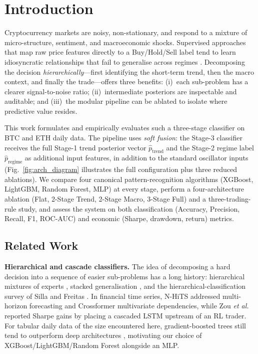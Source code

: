 \documentclass[conference]{IEEEtran}
\begin{document}
\section{Introduction}
Cryptocurrency markets are noisy, non-stationary, and respond to a mixture of micro-structure, sentiment, and macroeconomic shocks. Supervised approaches that map raw price features directly to a Buy/Hold/Sell label tend to learn idiosyncratic relationships that fail to generalise across regimes \cite{sezer2020,patel2015trend}. Decomposing the decision \emph{hierarchically}---first identifying the short-term trend, then the macro context, and finally the trade---offers three benefits: (i)~each sub-problem has a clearer signal-to-noise ratio; (ii)~intermediate posteriors are inspectable and auditable; and (iii)~the modular pipeline can be ablated to isolate where predictive value resides.

This work formulates and empirically evaluates such a three-stage classifier on BTC and ETH daily data. The pipeline uses \emph{soft fusion}: the Stage-3 classifier receives the full Stage-1 trend posterior vector $\hat p_{\mathrm{trend}}$ and the Stage-2 regime label $\hat p_{\mathrm{regime}}$ as additional input features, in addition to the standard oscillator inputs (Fig.~\ref{fig:arch_diagram} illustrates the full configuration plus three reduced ablations). We compare four canonical pattern-recognition algorithms (XGBoost, LightGBM, Random Forest, MLP) at every stage, perform a four-architecture ablation (Flat, 2-Stage Trend, 2-Stage Macro, 3-Stage Full) and a three-trading-rule study, and assess the system on both classification (Accuracy, Precision, Recall, F1, ROC-AUC) and economic (Sharpe, drawdown, return) metrics.

\subsection{Related Work}
\textbf{Hierarchical and cascade classifiers.} The idea of decomposing a hard decision into a sequence of easier sub-problems has a long history: hierarchical mixtures of experts \cite{jordan1994hme}, stacked generalisation \cite{wolpert1992stacked}, and the hierarchical-classification survey of Silla and Freitas \cite{silla2011hierarchical}. In financial time series, N-HiTS \cite{challu2023nhits} addressed multi-horizon forecasting and Crossformer \cite{zhang2023crossformer} multivariate dependencies, while Zou \emph{et al.} \cite{zou2024cascadelstm} reported Sharpe gains by placing a cascaded LSTM upstream of an RL trader. For tabular daily data of the size encountered here, gradient-boosted trees still tend to outperform deep architectures \cite{grinsztajn2022tabular,shwartzziv2022tabular}, motivating our choice of XGBoost/LightGBM/Random Forest alongside an MLP.
\end{document}
